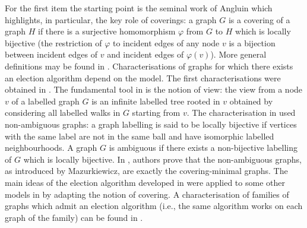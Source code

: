 \documentclass[11pt,envcountsame,letterpaper]{llncs}
\begin{document}
For the first item  the starting point is the seminal  work of Angluin
\cite{Angluin} which
 highlights, in particular, the key role of coverings: a graph $G$ is a 
covering of a graph $H$ if there is a surjective homomorphism
$\varphi$ from $G$ to $H$ which is locally bijective (the restriction of
$\varphi$ to incident edges of any node $v$ is a bijection between
incident edges of $v$ and incident edges of $\varphi(v)$).
 More general definitions may be found in \cite{BVfibrations}.
Characterisations of graphs for which there exists an election algorithm
depend on the model.
The first  characterisations were obtained in
\cite{BVelection,YKsolvable,MazurEnum}.
The fundamental tool in 
\cite{BVelection,YKsolvable} is the notion of view: the view from a node
$v$ of a labelled graph $G$ is an infinite labelled tree rooted in $v$
obtained by considering all labelled walks in $G$ starting from $v$.
The characterisation in \cite{MazurEnum} used non-ambiguous graphs:
a graph labelling is said to be locally bijective if vertices with the same
label are not in the same ball and 
have isomorphic labelled neighbourhoods. A graph $G$ is   ambiguous 
if there exists a non-bijective
  labelling of $G$ which is locally bijective.
In \cite{GMMrecog}, authors  prove that  the non-ambiguous graphs, as 
introduced by Mazurkiewicz, are exactly
the covering-minimal graphs.
The main ideas of the election algorithm developed in  
\cite{MazurEnum} were applied 
 to some other models in
\cite{CMasynj,CMsynchro,Csofsem} by adapting the notion of covering.
A characterisation of families of graphs which admit an election algorithm
(i.e., the same algorithm works on each graph of the family)
can be found in \cite{CGM12}.
\end{document}
